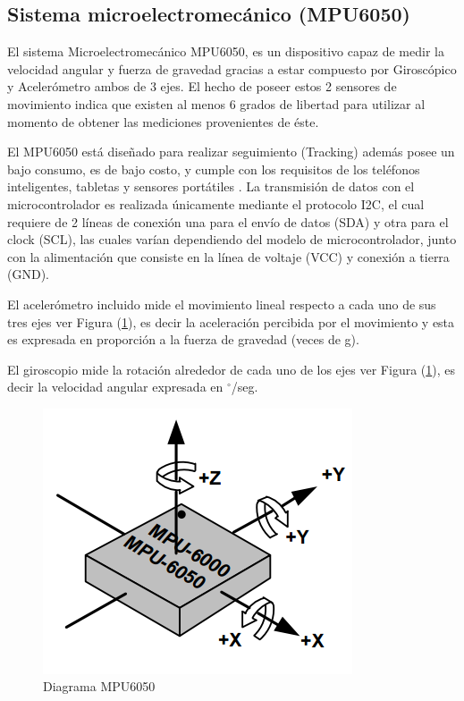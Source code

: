 \documentclass[12pt,a4paper]{article}
\newcommand{\grad}{$^{\circ}$}
\begin{document}
\newpage
\subsection{Sistema microelectromecánico (MPU6050)}

El sistema Microelectromecánico MPU6050\cite{MPU6050}, es un dispositivo capaz de medir la velocidad angular y fuerza de gravedad gracias a estar compuesto por Giroscópico y Acelerómetro ambos de 3 ejes. El hecho de poseer estos 2 sensores de movimiento indica que existen al menos 6 grados de libertad para utilizar al momento de obtener las mediciones provenientes de éste.

El MPU6050 está diseñado para realizar seguimiento (Tracking) además posee un bajo consumo, es de bajo costo, y cumple con los requisitos de los teléfonos inteligentes, tabletas y sensores portátiles \cite{MPU6050}.
La transmisión de datos con el microcontrolador es realizada únicamente mediante el protocolo I2C, el cual requiere de 2 líneas de conexión una para el envío de datos (SDA) y otra para el clock (SCL), las cuales varían dependiendo del modelo de microcontrolador, junto con la alimentación que consiste en la línea de voltaje (VCC) y conexión a tierra (GND).

El acelerómetro incluido mide el movimiento lineal respecto a cada uno de sus tres ejes ver Figura (\ref{fig:MPU6050}), es decir la aceleración percibida por el movimiento y esta es expresada en proporción a la fuerza de gravedad (veces de g).

El giroscopio mide la rotación alrededor de cada uno de los ejes ver Figura (\ref{fig:MPU6050}), es decir la velocidad angular expresada en \grad/seg.

\begin{figure}[H]
	\centering
	\includegraphics[scale=0.5]{images/MPU6050}
	\caption{Diagrama MPU6050}
	\label{fig:MPU6050}
\end{figure}
\end{document}
